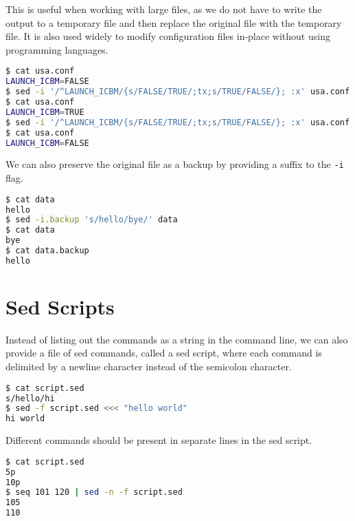 This is useful when working with large files, as we do not have to write the output to a temporary file and then replace the original file with the temporary file.
It is also used widely to modify configuration files in-place without using programming languages.

\begin{lstlisting}[language=bash]
$ cat usa.conf
LAUNCH_ICBM=FALSE
$ sed -i '/^LAUNCH_ICBM/{s/FALSE/TRUE/;tx;s/TRUE/FALSE/}; :x' usa.conf
$ cat usa.conf
LAUNCH_ICBM=TRUE
$ sed -i '/^LAUNCH_ICBM/{s/FALSE/TRUE/;tx;s/TRUE/FALSE/}; :x' usa.conf
$ cat usa.conf
LAUNCH_ICBM=FALSE
\end{lstlisting}

We can also preserve the original file as a backup by providing a suffix to the \lstinline|-i| flag.

\begin{lstlisting}[language=bash]
$ cat data
hello
$ sed -i.backup 's/hello/bye/' data
$ cat data
bye
$ cat data.backup
hello
\end{lstlisting}

\section{Sed Scripts}

Instead of listing out the commands as a string in the command line, we can also provide a file of sed commands, called a sed script, where each command is delimited by a newline character instead of the semicolon character.

\begin{lstlisting}[language=bash]
$ cat script.sed
s/hello/hi
$ sed -f script.sed <<< "hello world"
hi world
\end{lstlisting}

Different commands should be present in separate lines in the sed script.

\begin{lstlisting}[language=bash]
$ cat script.sed
5p
10p
$ seq 101 120 | sed -n -f script.sed
105
110
\end{lstlisting}


